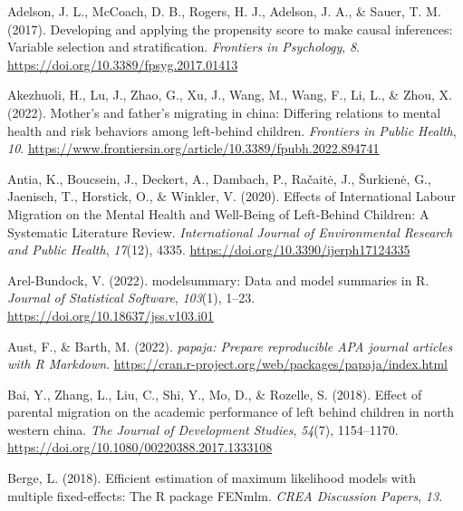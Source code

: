 \documentclass[
  man,floatsintext]{apa7}
\newlength{\cslhangindent}
\newlength{\cslentryspacingunit} %
\newenvironment{CSLReferences}[2] %
 {%
  \setlength{\parindent}{0pt}
  \ifodd #1
  \let\oldpar\par
  \def\par{\hangindent=\cslhangindent\oldpar}
  \fi
  \setlength{\parskip}{#2\cslentryspacingunit}
 }%
 {}
\begin{document}
\hypertarget{refs}{}
\begin{CSLReferences}{1}{0}
\leavevmode{}%
Adelson, J. L., McCoach, D. B., Rogers, H. J., Adelson, J. A., \& Sauer, T. M. (2017). Developing and applying the propensity score to make causal inferences: Variable selection and stratification. \emph{Frontiers in Psychology}, \emph{8}. \url{https://doi.org/10.3389/fpsyg.2017.01413}

\leavevmode{}%
Akezhuoli, H., Lu, J., Zhao, G., Xu, J., Wang, M., Wang, F., Li, L., \& Zhou, X. (2022). Mother's and father's migrating in china: Differing relations to mental health and risk behaviors among left-behind children. \emph{Frontiers in Public Health}, \emph{10}. \url{https://www.frontiersin.org/article/10.3389/fpubh.2022.894741}

\leavevmode{}%
Antia, K., Boucsein, J., Deckert, A., Dambach, P., Račaitė, J., Šurkienė, G., Jaenisch, T., Horstick, O., \& Winkler, V. (2020). Effects of International Labour Migration on the Mental Health and Well-Being of Left-Behind Children: A Systematic Literature Review. \emph{International Journal of Environmental Research and Public Health}, \emph{17}(12), 4335. \url{https://doi.org/10.3390/ijerph17124335}

\leavevmode{}%
Arel-Bundock, V. (2022). {modelsummary}: Data and model summaries in {R}. \emph{Journal of Statistical Software}, \emph{103}(1), 1--23. \url{https://doi.org/10.18637/jss.v103.i01}

\leavevmode{}%
Aust, F., \& Barth, M. (2022). \emph{{papaja}: {Prepare} reproducible {APA} journal articles with {R Markdown}}. \url{https://cran.r-project.org/web/packages/papaja/index.html}

\leavevmode{}%
Bai, Y., Zhang, L., Liu, C., Shi, Y., Mo, D., \& Rozelle, S. (2018). Effect of parental migration on the academic performance of left behind children in north western china. \emph{The Journal of Development Studies}, \emph{54}(7), 1154--1170. \url{https://doi.org/10.1080/00220388.2017.1333108}

\leavevmode{}%
Berge, L. (2018). Efficient estimation of maximum likelihood models with multiple fixed-effects: The {R} package {FENmlm}. \emph{CREA Discussion Papers}, \emph{13}.


\end{CSLReferences}
\end{document}
